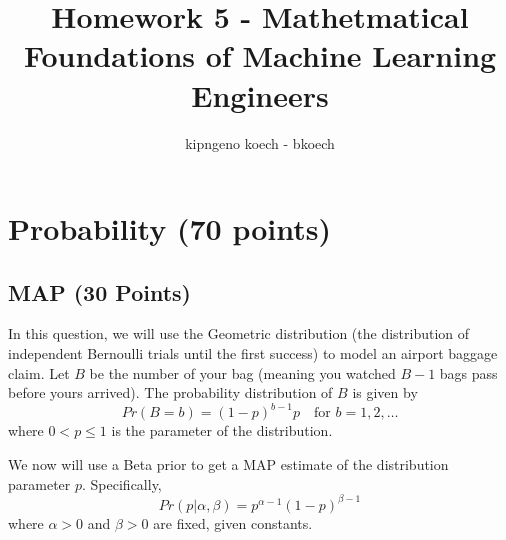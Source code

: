 \documentclass[a3paper,12pt]{article} %
\begin{document}
\author{kipngeno koech - bkoech}
\title{Homework 5 - Mathetmatical Foundations of Machine Learning Engineers}
\maketitle

\medskip


\section{Probability (70 points)}

\subsection{MAP (30 Points)}
In this question, we will use the Geometric distribution (the distribution of independent Bernoulli trials until the first success) to model an airport baggage claim. Let \( B \) be the number of your bag (meaning you watched \( B - 1 \) bags pass before yours arrived). The probability distribution of \( B \) is given by
\[
Pr(B = b) = (1 - p)^{b-1} p \quad \text{for } b = 1, 2, \ldots
\]
where \( 0 < p \leq 1 \) is the parameter of the distribution.

We now will use a Beta prior to get a MAP estimate of the distribution parameter \( p \). Specifically,
\[
Pr(p|\alpha, \beta) = p^{\alpha - 1} (1 - p)^{\beta - 1}
\]
where \( \alpha > 0 \) and \( \beta > 0 \) are fixed, given constants.
\end{document}
